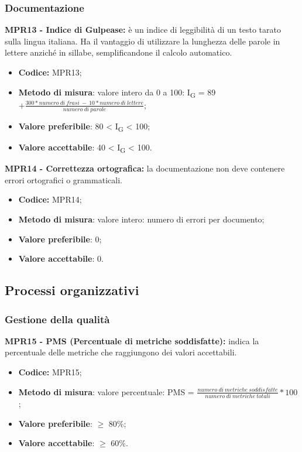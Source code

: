 \subsubsection{Documentazione}
\textbf{MPR13 - Indice di Gulpease:} è un indice di leggibilità di un testo tarato sulla lingua italiana. 
Ha il vantaggio di utilizzare la lunghezza delle parole in lettere anziché in sillabe, semplificandone il calcolo automatico. 
\begin{itemize}
    \item \textbf{Codice:} MPR13;
    \item \textbf{Metodo di misura}: valore intero da 0 a 100: I\textsubscript{G} = 89 $+ \frac{300*numero \ di \ frasi \ - \ 10*numero \ di \ lettere}{numero \ di \ parole}$;
    \item \textbf{Valore preferibile}: 80 < I\textsubscript{G} < 100;
    \item \textbf{Valore accettabile}: 40 < I\textsubscript{G} < 100.
\end{itemize}
\textbf{MPR14 - Correttezza ortografica:} la documentazione non deve contenere errori ortografici o grammaticali. 
\begin{itemize}
    \item \textbf{Codice:} MPR14;
    \item \textbf{Metodo di misura}: valore intero: numero di errori per documento;
    \item \textbf{Valore preferibile}: 0;
    \item \textbf{Valore accettabile}: 0.
\end{itemize}
\subsection{Processi organizzativi}
\subsubsection{Gestione della qualità}
\textbf{MPR15 - PMS (Percentuale di metriche soddisfatte):} indica la percentuale delle metriche che raggiungono dei valori accettabili.
\begin{itemize}
    \item \textbf{Codice:} MPR15;
    \item \textbf{Metodo di misura}: valore percentuale: PMS = $\frac{numero \ di \ metriche \ soddisfatte}{numero \ di \ metriche \ totali} * 100$ ;
    \item \textbf{Valore preferibile}: $\geq$ 80\%;
    \item \textbf{Valore accettabile}: $\geq$ 60\%.
\end{itemize}
\newpage
